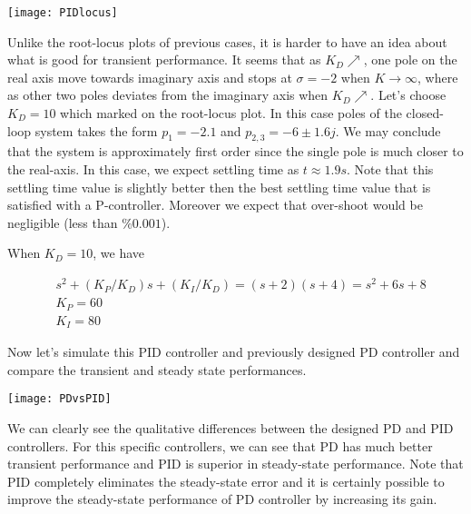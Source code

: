 \documentclass[twoside]{article}
\begin{document}
\vspace{12 pt}

  \begin{minipage}[h]{1\linewidth}
    \begin{center}
      \texttt{[image: PIDlocus]}
    \end{center}
  \end{minipage}

\vspace{12 pt}

Unlike the root-locus plots of previous cases, it is harder to
have an idea about what is good for transient performance.
It seems that as $K_D \nearrow$, one pole on the real axis 
move towards imaginary axis and stops at $\sigma = -2$ when
$K \to \infty$, where as other two poles deviates from the imaginary
axis when $K_D \nearrow$. Let's choose $K_D = 10$ which marked 
on the root-locus plot. In this case poles of the closed-loop system 
takes the form $p_1 = -2.1$ and $p_{2,3} = -6 \pm 1.6 j$. We 
may conclude that the system is approximately first order since
the single pole is much closer to the real-axis. In this case, we
expect settling time as $t \approx 1.9 s$. Note that this settling time
value is slightly better then the best settling time value that is
satisfied with a P-controller. Moreover we expect that over-shoot would
be negligible (less than $\% 0.001$).

When $K_D = 10$, we have 

\begin{align*}
&s^2 +   (K_P/K_D) s  + (K_I/K_D) = (s+2)(s+4) = s^2 + 6 s + 8
\\
&K_P = 60
\\
&K_I = 80
\end{align*}

Now let's simulate this PID controller and previously designed PD
controller and compare the transient and steady state performances.

\vspace{12 pt}

  \begin{minipage}[h]{1\linewidth}
    \begin{center}
      \texttt{[image: PDvsPID]}
    \end{center}
  \end{minipage}

\vspace{12 pt}

We can clearly see the qualitative differences between the designed PD
and PID controllers. For this specific controllers, we can see that 
PD has much better transient performance and PID is superior in
steady-state performance. Note that PID completely eliminates the
steady-state error and it is certainly possible to improve the
steady-state performance of PD controller by increasing its gain.
\end{document}
